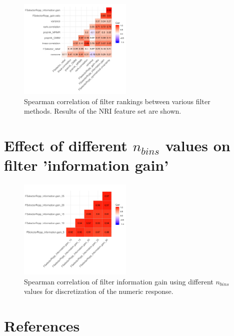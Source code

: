 \documentclass[letterpaper, peerreview]{IEEEtran}
\begin{document}
\pagebreak

\begin{figure} [ht]
	\begin{center}
		\includegraphics[width=0.48\textwidth] {correlation-filter-nri-1.pdf}
		\caption{Spearman correlation of filter rankings between various filter methods. Results of the NRI feature set are shown.}\label{fig:correlation-filters}
	\end{center}
\end{figure}

\section{Effect of different \texorpdfstring{\(n_{bins}\)}{nbins} values on filter 'information gain'}

\begin{figure} [ht]
	\begin{center}
		\includegraphics[width=0.48\textwidth] {correlation-nbins-1.pdf}
		\caption{Spearman correlation of filter information gain using different \texttt{\(n_{bins}\)} values for discretization of the numeric response.}\label{fig:correlation-nbins}
	\end{center}
\end{figure}

\pagebreak




\section*{References}
\end{document}
